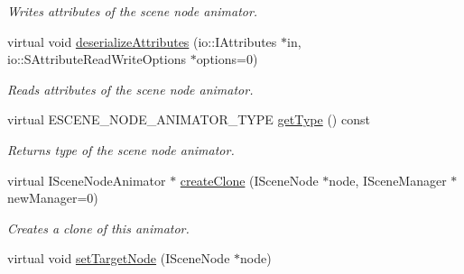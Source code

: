 \begin{DoxyCompactItemize}
\begin{DoxyCompactList}\small\item\em Writes attributes of the scene node animator. \end{DoxyCompactList}\item 
\hypertarget{classirr_1_1scene_1_1_c_scene_node_animator_collision_response_a40a00608faa472c25f1c9f0a7daeeca1}{virtual void \hyperlink{classirr_1_1scene_1_1_c_scene_node_animator_collision_response_a40a00608faa472c25f1c9f0a7daeeca1}{deserialize\-Attributes} (io\-::\-I\-Attributes $\ast$in, io\-::\-S\-Attribute\-Read\-Write\-Options $\ast$options=0)}\label{classirr_1_1scene_1_1_c_scene_node_animator_collision_response_a40a00608faa472c25f1c9f0a7daeeca1}

\begin{DoxyCompactList}\small\item\em Reads attributes of the scene node animator. \end{DoxyCompactList}\item 
\hypertarget{classirr_1_1scene_1_1_c_scene_node_animator_collision_response_a04afba6891b21002191bc503dc81ca74}{virtual E\-S\-C\-E\-N\-E\-\_\-\-N\-O\-D\-E\-\_\-\-A\-N\-I\-M\-A\-T\-O\-R\-\_\-\-T\-Y\-P\-E \hyperlink{classirr_1_1scene_1_1_c_scene_node_animator_collision_response_a04afba6891b21002191bc503dc81ca74}{get\-Type} () const }\label{classirr_1_1scene_1_1_c_scene_node_animator_collision_response_a04afba6891b21002191bc503dc81ca74}

\begin{DoxyCompactList}\small\item\em Returns type of the scene node animator. \end{DoxyCompactList}\item 
virtual I\-Scene\-Node\-Animator $\ast$ \hyperlink{classirr_1_1scene_1_1_c_scene_node_animator_collision_response_a4b248cf667f4f689a3e39aee510a20fb}{create\-Clone} (I\-Scene\-Node $\ast$node, I\-Scene\-Manager $\ast$new\-Manager=0)
\begin{DoxyCompactList}\small\item\em Creates a clone of this animator. \end{DoxyCompactList}\item 
\hypertarget{classirr_1_1scene_1_1_c_scene_node_animator_collision_response_ae2673a3071fd43a7ca9ccd93e258d7cb}{virtual void \hyperlink{classirr_1_1scene_1_1_c_scene_node_animator_collision_response_ae2673a3071fd43a7ca9ccd93e258d7cb}{set\-Target\-Node} (I\-Scene\-Node $\ast$node)}\label{classirr_1_1scene_1_1_c_scene_node_animator_collision_response_ae2673a3071fd43a7ca9ccd93e258d7cb}


\end{DoxyCompactItemize}

